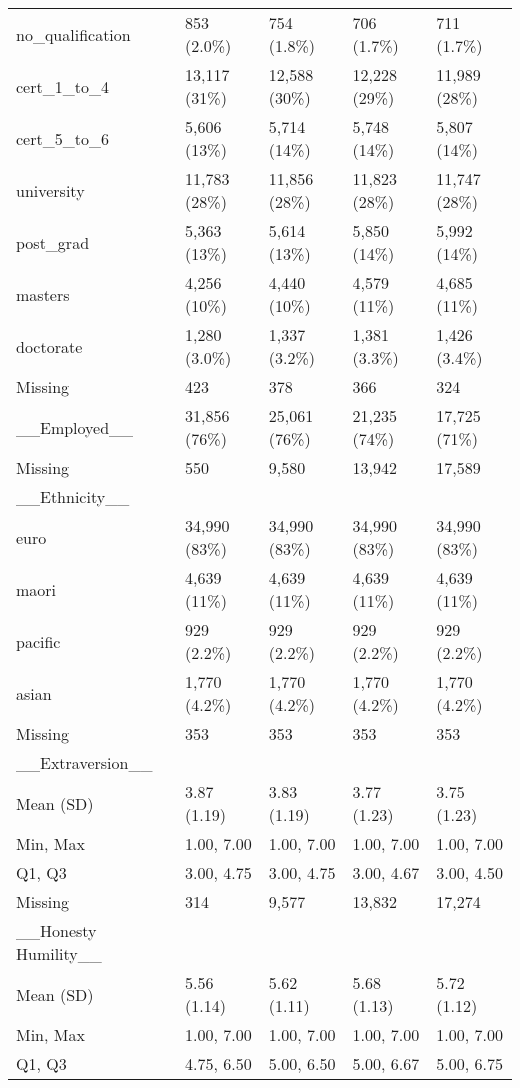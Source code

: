 \documentclass[
  single column]{article}
\begin{document}
\begin{longtable}[t]{lllll}
no\_qualification & 853 (2.0\%) & 754 (1.8\%) & 706 (1.7\%) & 711 (1.7\%)\\
cert\_1\_to\_4 & 13,117 (31\%) & 12,588 (30\%) & 12,228 (29\%) & 11,989 (28\%)\\
\addlinespace
cert\_5\_to\_6 & 5,606 (13\%) & 5,714 (14\%) & 5,748 (14\%) & 5,807 (14\%)\\
university & 11,783 (28\%) & 11,856 (28\%) & 11,823 (28\%) & 11,747 (28\%)\\
post\_grad & 5,363 (13\%) & 5,614 (13\%) & 5,850 (14\%) & 5,992 (14\%)\\
masters & 4,256 (10\%) & 4,440 (10\%) & 4,579 (11\%) & 4,685 (11\%)\\
doctorate & 1,280 (3.0\%) & 1,337 (3.2\%) & 1,381 (3.3\%) & 1,426 (3.4\%)\\
\addlinespace
Missing & 423 & 378 & 366 & 324\\
\_\_Employed\_\_ & 31,856 (76\%) & 25,061 (76\%) & 21,235 (74\%) & 17,725 (71\%)\\
Missing & 550 & 9,580 & 13,942 & 17,589\\
\_\_Ethnicity\_\_ &   ~~&   ~~&   ~~& ~~\\
euro & 34,990 (83\%) & 34,990 (83\%) & 34,990 (83\%) & 34,990 (83\%)\\
\addlinespace
maori & 4,639 (11\%) & 4,639 (11\%) & 4,639 (11\%) & 4,639 (11\%)\\
pacific & 929 (2.2\%) & 929 (2.2\%) & 929 (2.2\%) & 929 (2.2\%)\\
asian & 1,770 (4.2\%) & 1,770 (4.2\%) & 1,770 (4.2\%) & 1,770 (4.2\%)\\
Missing & 353 & 353 & 353 & 353\\
\_\_Extraversion\_\_ &   ~~&   ~~&   ~~& ~~\\
\addlinespace
Mean (SD) & 3.87 (1.19) & 3.83 (1.19) & 3.77 (1.23) & 3.75 (1.23)\\
Min, Max & 1.00, 7.00 & 1.00, 7.00 & 1.00, 7.00 & 1.00, 7.00\\
Q1, Q3 & 3.00, 4.75 & 3.00, 4.75 & 3.00, 4.67 & 3.00, 4.50\\
Missing & 314 & 9,577 & 13,832 & 17,274\\
\_\_Honesty Humility\_\_ &   ~~&   ~~&   ~~& ~~\\
\addlinespace
Mean (SD) & 5.56 (1.14) & 5.62 (1.11) & 5.68 (1.13) & 5.72 (1.12)\\
Min, Max & 1.00, 7.00 & 1.00, 7.00 & 1.00, 7.00 & 1.00, 7.00\\
Q1, Q3 & 4.75, 6.50 & 5.00, 6.50 & 5.00, 6.67 & 5.00, 6.75\\

\end{longtable}
\end{document}
